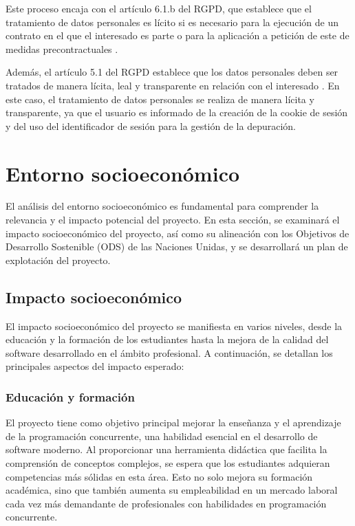 Este proceso encaja con el artículo 6.1.b del RGPD, que establece que el tratamiento de datos personales es lícito si es necesario para la ejecución de un contrato en el que el interesado es parte o para la aplicación a petición de este de medidas precontractuales \cite{rgpd_art6}. 

Además, el artículo 5.1 del RGPD establece que los datos personales deben ser tratados de manera lícita, leal y transparente en relación con el interesado \cite{rgpd_art5}. En este caso, el tratamiento de datos personales se realiza de manera lícita y transparente, ya que el usuario es informado de la creación de la cookie de sesión y del uso del identificador de sesión para la gestión de la depuración.

\section{Entorno socioeconómico}\label{sec:entorno-socio-economico}

El análisis del entorno socioeconómico es fundamental para comprender la relevancia y el impacto potencial del proyecto. En esta sección, se examinará el impacto socioeconómico del proyecto, así como su alineación con los Objetivos de Desarrollo Sostenible (ODS) de las Naciones Unidas, y se desarrollará un plan de explotación del proyecto.

\subsection{Impacto socioeconómico}\label{subsec:impacto-socio-economico}
El impacto socioeconómico del proyecto se manifiesta en varios niveles, desde la educación y la formación de los estudiantes hasta la mejora de la calidad del software desarrollado en el ámbito profesional. A continuación, se detallan los principales aspectos del impacto esperado:

\subsubsection{Educación y formación}
El proyecto tiene como objetivo principal mejorar la enseñanza y el aprendizaje de la programación concurrente, una habilidad esencial en el desarrollo de software moderno. Al proporcionar una herramienta didáctica que facilita la comprensión de conceptos complejos, se espera que los estudiantes adquieran competencias más sólidas en esta área. Esto no solo mejora su formación académica, sino que también aumenta su empleabilidad en un mercado laboral cada vez más demandante de profesionales con habilidades en programación concurrente.

